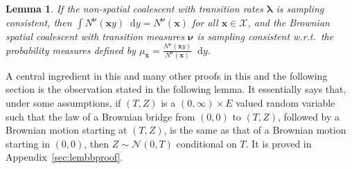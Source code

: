 \documentclass[reqno,draft]{amsart}
\numberwithin{equation}{section}
\theoremstyle{plain}
\newtheorem{lemma}[theorem]{Lemma}
\theoremstyle{remark}
\newcommand*\diff{\mathop{}\!\mathrm{d}}
\newcommand{\fpart}{\Pi} %
\DeclareMathOperator{\dcb}{dec}
\newcommand{\fsp}{f_\mathrm{sp}}
\begin{document}
\begin{lemma}\label{lem:nulambda1}
    If the non-spatial coalescent with transition rates $\boldsymbol \lambda$ is sampling consistent, then $\int N^{\boldsymbol\nu}(\boldsymbol xy) \diff y = N^{\boldsymbol\nu}(\boldsymbol x)$ for all $\boldsymbol x\in \mathcal{X}$, and the Brownian spatial coalescent with transition measures $\boldsymbol \nu$ is sampling consistent w.r.t.\ the probability measures defined by $\mu_{\boldsymbol x} = \frac{N^{\boldsymbol \nu}(\boldsymbol xy)}{N^{\boldsymbol \nu}(\boldsymbol x)}\diff y $.
\end{lemma}
A central ingredient in this and many other proofs in this and the following section is the observation stated in the following lemma. It essentially says that, under some assumptions, if $(T,Z)$ is a $(0,\infty)\times E$ valued random variable such that the law of a Brownian bridge from $(0,0)$ to $(T,Z)$, followed by a Brownian motion starting at $(T,Z)$, is the same as that of a Brownian motion starting in $(0,0)$, then $Z \sim \mathcal{N}(0,T)$ conditional on $T$. It is proved in Appendix~\ref{sec:lembbproof}.
\end{document}
